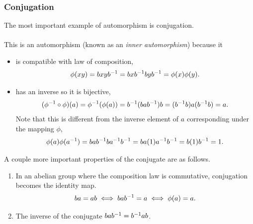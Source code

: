 \documentclass[MathsNotesBase.tex]{subfiles}
\begin{document}
{		\subsubsection{Conjugation}
		The most important example of automorphism is conjugation.\\\\
		This is an automorphism (known as an \textit{inner automorphism}) because it
		\begin{itemize}
			\item{is compatible with law of composition, 
				\[ \phi(xy) = bxy{b}^{-1} = bx{b}^{-1}by{b}^{-1} = \phi(x)\phi(y). \]
			}
			\item{has an inverse so it is bijective, 
				\[ ({\phi}^{-1} \circ \phi)(a) = {\phi}^{-1}(\phi(a)) = {b}^{-1}(ba{b}^{-1})b = ({b}^{-1}b)a({b}^{-1}b) = a. \]
				Note that this is different from the inverse element of $a$ corresponding under the mapping $\phi$,
				\[ \phi(a)\phi({a}^{-1}) = ba{b}^{-1}b{a}^{-1}{b}^{-1} = ba(1){a}^{-1}{b}^{-1} = b(1){b}^{-1} = 1. \]
			}
		\end{itemize}
		A couple more important properties of the conjugate are as follows.
		\begin{enumerate}[label=(\roman*)]
			\item{In an abelian group where the composition law is commutative, conjugation becomes the identity map.
				\[ ba = ab \iff ba{b}^{-1} = a \iff \phi(a) = a. \]}
			\item{The inverse of the conjugate ${ ba{b}^{-1} = {b}^{-1}ab }$.}
		\end{enumerate}
	}
\end{document}
